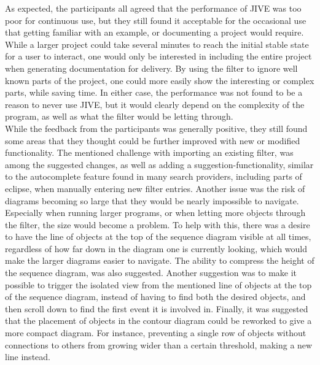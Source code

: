As expected, the participants all agreed that the performance of JIVE was too poor for continuous use, but they still found it acceptable for the occasional use that getting familiar with an example, or documenting a project would require.
While a larger project could take several minutes to reach the initial stable state for a user to interact, one would only be interested in including the entire project when generating documentation for delivery.
By using the filter to ignore well known parts of the project, one could more easily show the interesting or complex parts, while saving time.
In either case, the performance was not found to be a reason to never use JIVE, but it would clearly depend on the complexity of the program, as well as what the filter would be letting through.
~\\

While the feedback from the participants was generally positive, they still found some areas that they thought could be further improved with new or modified functionality.
The mentioned challenge with importing an existing filter, was among the suggested changes, as well as adding a suggestion-functionality, similar to the autocomplete feature found in many search providers, including parts of eclipse, when manually entering new filter entries.
Another issue was the risk of diagrams becoming so large that they would be nearly impossible to navigate.
Especially when running larger programs, or when letting more objects through the filter, the size would become a problem.
To help with this, there was a desire to have the line of objects at the top of the sequence diagram visible at all times, regardless of how far down in the diagram one is currently looking, which would make the larger diagrams easier to navigate.
The ability to compress the height of the sequence diagram, was also suggested.
Another suggestion was to make it possible to trigger the isolated view from the mentioned line of objects at the top of the sequence diagram, instead of having to find both the desired objects, and then scroll down to find the first event it is involved in.
Finally, it was suggested that the placement of objects in the contour diagram could be reworked to give a more compact diagram.
For instance, preventing a single row of objects without connections to others from growing wider than a certain threshold, making a new line instead.
~\\

